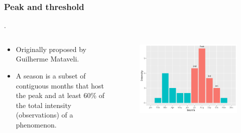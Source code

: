 \documentclass[aspectratio=169]{beamer}
\begin{document}
\begin{frame}
    \frametitle{Peak and threshold}.
    \begin{columns}
        \begin{column}{0.5\linewidth}
            \begin{itemize}
                \item Originally proposed by Guilherme Mataveli.
                \item A season is a subset of contiguous months that host the
                    peak and at least 60\% of the total intensity
                    (observations) of a phenomenon.
            \end{itemize}
        \end{column}
        \begin{column}{0.5\linewidth}
            \begin{figure}[h]
                \includegraphics[width=0.99\linewidth]
                {./images/peak_thres_hist.png}
            \end{figure}
        \end{column}
    \end{columns}
\end{frame}

\end{document}
